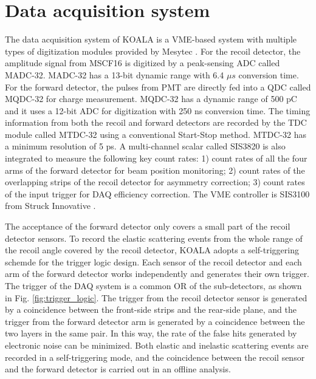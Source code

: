\documentclass[number]{elsarticle}
\begin{document}
\section{Data acquisition system}
\label{sec:daq}

The data acquisition system of KOALA is a VME-based system with multiple types
of digitization modules provided by Mesytec \cite{mesytec}.
For the recoil detector, the amplitude signal from MSCF16 is digitized by a peak-sensing ADC called MADC-32.
MADC-32 has a 13-bit dynamic range with 6.4 \(\mu s\) conversion time.
For the forward detector, the pulses from PMT are directly fed into a QDC called MQDC-32 for charge measurement.
MQDC-32 has a dynamic range of 500 pC and it uses a 12-bit ADC for digitization with 250 ns conversion time.
The timing information from both the recoil and forward detectors are recorded by the TDC module called MTDC-32 using a conventional Start-Stop method.
MTDC-32 has a minimum resolution of 5 ps.
A multi-channel scalar called SIS3820 \cite{sis} is also integrated to measure the following key count rates: 1) count rates of all the four arms of the forward detector for 
beam position monitoring; 2) count rates of the overlapping strips of the recoil detector for asymmetry correction; 3) count rates of the input trigger
for DAQ efficiency correction.
The VME controller is SIS3100 from Struck Innovative \cite{sis}.

The acceptance of the forward detector only covers a small part of the recoil detector sensors.
To record the elastic scattering events from the whole range of the recoil angle covered by the recoil detector, KOALA adopts a self-triggering schemde for the trigger logic design.
Each sensor of the recoil detector and each arm of the forward detector works independently and generates their own trigger. 
The trigger of the DAQ system is a common OR of the sub-detectors, as shown in Fig. \ref{fig:trigger_logic}.
The trigger from the recoil detector sensor is generated by a coincidence between the front-side strips and the rear-side plane, 
and the trigger from the forward detector arm is generated by a coincidence between the two layers in the same pair.
In this way, the rate of the false hits generated by electronic noise can be minimized.
Both elastic and inelastic scattering events are recorded in a self-triggering mode, and the coincidence between the recoil sensor and the forward detector is carried out in an offline analysis.
\end{document}
